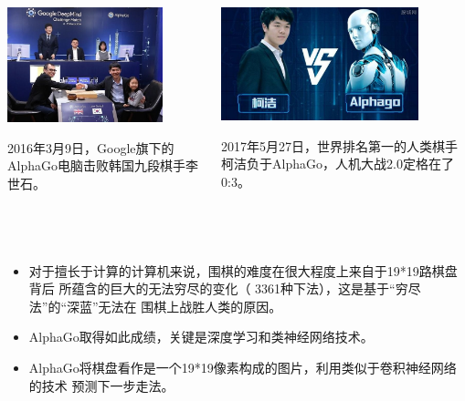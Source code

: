 \begin{frame}[fragile]
  \frametitle{~}

  \begin{columns}
    \begin{column}[T]{.5\linewidth}
      \includegraphics[width=0.8\textwidth]{figs/intro/alphago_1.png}

      2016年3月9日，Google旗下的AlphaGo电脑击败韩国九段棋手李世石。
    \end{column}
    \begin{column}[T]{.5\linewidth}
      \includegraphics[width=0.8\textwidth]{figs/intro/alphago_2.png}

      2017年5月27日，世界排名第一的人类棋手柯洁负于AlphaGo，人机大战2.0定格在了0:3。
    \end{column}
  \end{columns}
\end{frame}

\begin{frame}[fragile]
  \frametitle{~}

  \begin{itemize}
  \item 对于擅长于计算的计算机来说，围棋的难度在很大程度上来自于19*19路棋盘背后
    所蕴含的巨大的无法穷尽的变化（ 3361种下法），这是基于“穷尽法”的“深蓝”无法在
    围棋上战胜人类的原因。

  \item AlphaGo取得如此成绩，关键是深度学习和类神经网络技术。
  \item AlphaGo将棋盘看作是一个19*19像素构成的图片，利用类似于卷积神经网络的技术
    预测下一步走法。
  \end{itemize}
\end{frame}

